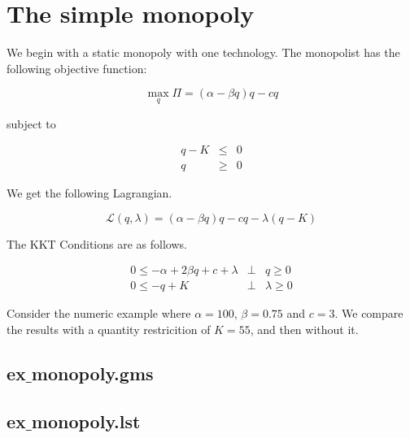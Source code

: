\documentclass[11pt]{article}
\begin{document}
\lstset{language=GAMS,
}

\section{The simple monopoly}

We begin with a static monopoly with one technology. The monopolist has the following objective function:

\begin{equation*}
	\max_q\Pi = (\alpha-\beta q)q - cq 
\end{equation*}

subject to

\begin{eqnarray*}
	q - K &\leq& 0\\
	q &\geq& 0 
\end{eqnarray*}
 
We get the following Lagrangian.

\begin{equation*}
	\mathcal{L}(q,\lambda)= (\alpha-\beta q)q - cq -\lambda(q-K)
\end{equation*}

The KKT Conditions are as follows.

\begin{eqnarray*}
	0 \leq -\alpha + 2\beta q + c + \lambda &\bot& q \geq 0\\
	0 \leq -q + K &\bot& \lambda \geq 0
\end{eqnarray*}

Consider the numeric example where $\alpha=100$, $\beta=0.75$ and $c=3$. We compare the results with a quantity restricition of $K=55$, and then without it.

\subsection*{ex$\_$monopoly.gms}



\subsection*{ex$\_$monopoly.lst}


\end{document}
